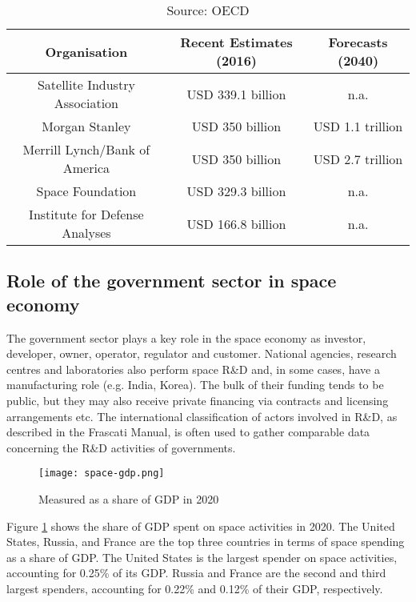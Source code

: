 \documentclass[12pt]{article}
\begin{document}
\begin{table}[ht]
    \centering
    \begin{tabular}{|c|c|c|}
        \hline
        \textbf{Organisation} & \textbf{Recent Estimates (2016)} & \textbf{Forecasts (2040)} \\
        \hline \hline
        Satellite Industry Association & USD 339.1 billion & n.a. \\
        \hline
        Morgan Stanley & USD 350 billion & USD 1.1 trillion \\
        \hline
        Merrill Lynch/Bank of America & USD 350 billion & USD 2.7 trillion  \\
        \hline
        Space Foundation & USD 329.3 billion & n.a. \\
        \hline
        Institute for Defense Analyses & USD 166.8 billion & n.a. \\
        \hline
    \end{tabular}
    \caption{Source: OECD}
    \label{tab:estimates}
\end{table}

\subsection{Role of the government sector in space economy}

The government sector plays a key role in the space economy as investor, developer, owner, operator, regulator and customer. National agencies, research centres and laboratories also perform space R\&D and, in some cases, have a manufacturing role (e.g. India, Korea). The bulk of their funding tends to be public, but they may also receive private financing via contracts and licensing arrangements etc. The international classification of actors involved in R\&D, as described in the Frascati Manual, is often used to gather comparable data concerning the R\&D activities of governments.

\begin{figure}[ht]
    \centering
    \texttt{[image: space-gdp.png]}
    \caption{Measured as a share of GDP in 2020}
    \label{fig:space-gdp}
\end{figure}

Figure \ref{fig:space-gdp} shows the share of GDP spent on space activities in 2020. The United States, Russia, and France are the top three countries in terms of space spending as a share of GDP. The United States is the largest spender on space activities, accounting for 0.25\% of its GDP. Russia and France are the second and third largest spenders, accounting for 0.22\% and 0.12\% of their GDP, respectively.
\end{document}
